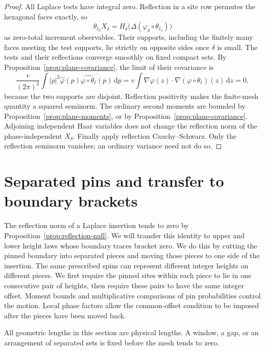 \documentclass[11pt]{article}
\theoremstyle{definition}
\theoremstyle{remark}
\numberwithin{equation}{section}
\begin{document}
\begin{proof}
All Laplace tests have integral zero.  Reflection in a site row
permutes the hexagonal faces exactly, so
\[
 \theta_{\ell_\delta}X_\delta
   =H_\delta\bigl(\Delta(\varphi_\delta\circ\theta_{\ell_\delta})\bigr)
\]
as zero-total increment observables.  Their supports, including the
finitely many faces meeting the test supports, lie strictly on
opposite sides once $\delta$ is small.  The tests and their reflections
converge smoothly on fixed compact sets.  By
Proposition~\ref{prop:plane-covariance}, the limit of their covariance is
\[
 \frac{v}{(2\pi)^2}\int |p|^2\widehat\varphi(p)
             \overline{\widehat{\varphi\circ\theta_\ell}(p)}\,\mathrm d p
    =v\int\nabla\varphi(z)\cdot
                   \nabla(\varphi\circ\theta_\ell)(z)\,\mathrm d z=0,
\]
because the two supports are disjoint.  Reflection positivity makes
the finite-mesh quantity a squared seminorm.  The ordinary second
moments are bounded by Proposition~\ref{prop:plane-moments}, or by
Proposition~\ref{prop:plane-covariance}.  Adjoining independent Haar
variables does not change the reflection norm of the phase-independent
$X_\delta$.  Finally apply reflection Cauchy--Schwarz.  Only the
reflection seminorm vanishes; an ordinary variance need not do so.
\end{proof}

\section{Separated pins and transfer to boundary brackets}\label{sec:pins}

The reflection norm of a Laplace insertion tends to zero by
Proposition~\ref{prop:reflection-null}.  We will transfer this identity to
upper and lower height laws whose boundary traces bracket zero.  We do
this by cutting the pinned boundary into separated pieces and moving
those pieces to one side of the insertion.  The same prescribed spins
can represent different integer heights on different pieces.  We first
require the pinned sites within each piece to lie in one consecutive
pair of heights, then require these pairs to have the same integer
offset.  Moment bounds and multiplicative comparisons of pin
probabilities control the motion.  Local phase factors allow the
common-offset condition to be imposed after the pieces have been moved
back.

All geometric lengths in this section are physical lengths.  A window,
a gap, or an arrangement of separated sets is fixed before the mesh
tends to zero.
\end{document}
